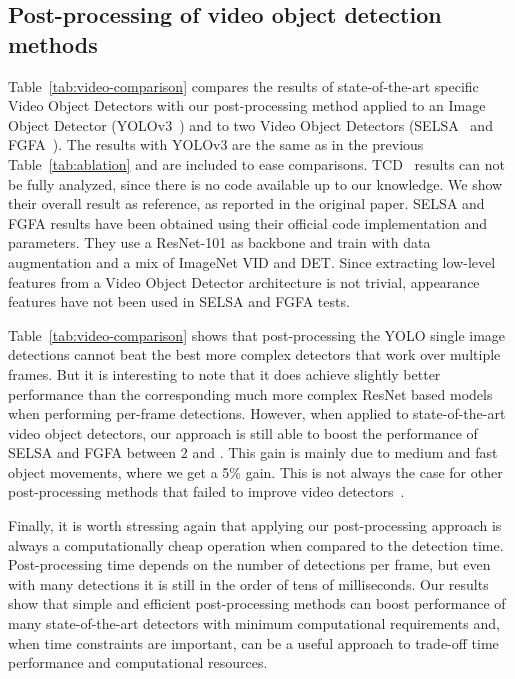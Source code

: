 \documentclass[letterpaper, 10 pt, conference]{ieeeconf}
\begin{document}
\subsection{Post-processing of video object detection methods}


Table~\ref{tab:video-comparison} compares the results of state-of-the-art specific Video Object Detectors with our post-processing method applied to an Image Object Detector (YOLOv3~\cite{redmon2018yolov3}) and to two Video Object Detectors (SELSA~\cite{wu2019selsa} and FGFA~\cite{Zhu_2017_ICCV}). The results with YOLOv3 are the same as in the previous Table~\ref{tab:ablation} and are included to ease comparisons. TCD~\cite{DBLP:journals/corr/abs-1811-11167} results can not be fully analyzed, since there is no code available up to our knowledge. We show their overall result as reference, as reported in the original paper. SELSA and FGFA results have been obtained using their official code implementation and parameters. They use a ResNet-101 as backbone and train with data augmentation and a mix of ImageNet VID and DET. Since extracting low-level features from a Video Object Detector architecture is not trivial, appearance features have not been used in SELSA and FGFA tests.

Table~\ref{tab:video-comparison} shows that post-processing the YOLO single image detections cannot beat the best more complex detectors that work over multiple frames. 
But it is interesting to note that it does achieve slightly better performance than the corresponding much more complex ResNet based models when performing per-frame detections. 
However, when applied to state-of-the-art video object detectors, our approach is still able to boost the performance of SELSA and FGFA between 2 and . This gain is mainly due to medium and fast object movements, where we get a 5\% gain. This is not always the case for other post-processing methods that failed to improve video detectors~\cite{wu2019selsa}.


Finally, it is worth stressing again that applying our post-processing approach is always a computationally cheap operation when compared to the detection time.  Post-processing time depends on the number of detections per frame, 
but even with many detections 
it is still in the order of tens of milliseconds. 
Our results show that simple and efficient post-processing methods can boost performance of many state-of-the-art detectors with minimum computational requirements and, when time constraints are important, can be a useful approach to trade-off time performance and computational resources.
\end{document}
